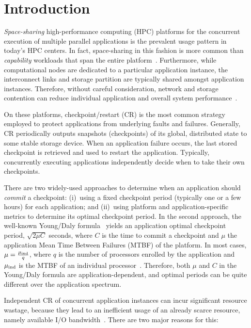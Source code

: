 
\section{Introduction}
\label{sec:intro}

\emph{Space-sharing} high-performance computing (HPC) platforms for the
concurrent execution of multiple parallel applications is the prevalent usage
pattern in today's HPC centers.  In fact, space-sharing in this fashion is more
common than \emph{capability} workloads that span the entire
platform~\cite{Weidner2016}. Furthermore, while computational nodes are
dedicated to a particular application instance, the interconnect links and
storage partition are typically shared amongst application instances.
Therefore, without careful consideration, network and storage contention can
reduce individual application and overall system
performance~\cite{Bhatele:2013:Neighborhood}.

On these platforms, checkpoint/restart (CR) is the most common strategy
employed to protect applications from underlying faults and failures.
Generally, CR periodically outputs snapshots (\ie checkpoints) of its global,
distributed state to some stable storage device. When an application failure
occurs, the last stored checkpoint is retrieved and used to restart the
application.  Typically, concurrently executing applications independently
decide when to take their own checkpoints.

There are two widely-used approaches to determine when an application should
\emph{commit} a checkpoint: (i)~using a fixed checkpoint period (typically one
or a few hours) for each application; and (ii)~using platform and
application-specific metrics to determine its optimal checkpoint period. In the
second approach, the well-known Young/Daly formula~\cite{young74,daly04} yields
an application optimal checkpoint period, $\sqrt{2 \mu C}$ seconds, where $C$
is the time to commit a checkpoint and $\mu$ the application Mean Time Between
Failures (MTBF) of the platform.  In most cases, $\mu = \frac{\mu_{\text{ind}}}{q}$,
where $q$ is the number of processors enrolled by the application and $\mu_{\text{ind}}$
is the MTBF of an individual processor~\cite{springer-monograph}. Therefore,
both $\mu$ and $C$ in the Young/Daly formula are application-dependent, and
optimal periods can be quite different over the application spectrum.

Independent CR of concurrent application instances can incur significant
resource wastage, because they lead to an inefficient usage of an already
scarce resource, namely available I/O bandwidth~\cite{Luu:2015:Multiplatform}.
There are two major reasons for this:

